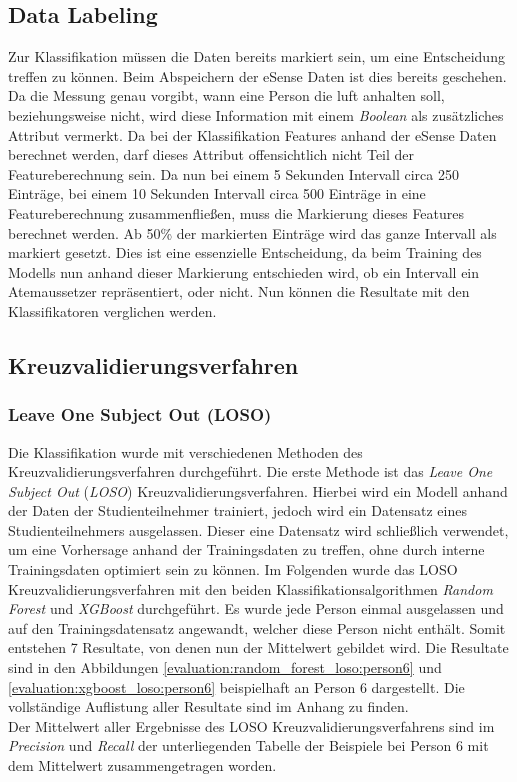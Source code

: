 \subsection{Data Labeling}
Zur Klassifikation müssen die Daten bereits markiert sein, um eine Entscheidung treffen zu können. 
Beim Abspeichern der eSense Daten ist dies bereits geschehen. 
Da die Messung genau vorgibt, wann eine Person die luft anhalten soll, beziehungsweise nicht, wird diese Information mit einem \textit{Boolean} als zusätzliches Attribut vermerkt.
Da bei der Klassifikation Features anhand der eSense Daten berechnet werden, darf dieses Attribut offensichtlich nicht Teil der Featureberechnung sein.
Da nun bei einem 5 Sekunden Intervall circa 250 Einträge, bei einem 10 Sekunden Intervall circa 500 Einträge in eine Featureberechnung zusammenfließen, muss die Markierung dieses Features berechnet werden.
Ab 50\% der markierten Einträge wird das ganze Intervall als markiert gesetzt.
Dies ist eine essenzielle Entscheidung, da beim Training des Modells nun anhand dieser Markierung entschieden wird, ob ein Intervall ein Atemaussetzer repräsentiert, oder nicht.
Nun können die Resultate mit den Klassifikatoren verglichen werden.

\subsection{Kreuzvalidierungsverfahren}
\subsubsection{Leave One Subject Out (LOSO)}
Die Klassifikation wurde mit verschiedenen Methoden des Kreuzvalidierungsverfahren durchgeführt. 
Die erste Methode ist das \textit{Leave One Subject Out} (\textit{LOSO}) Kreuzvalidierungsverfahren. 
Hierbei wird ein Modell anhand der Daten der Studienteilnehmer trainiert, jedoch wird ein Datensatz eines Studienteilnehmers ausgelassen. 
Dieser eine Datensatz wird schließlich verwendet, um eine Vorhersage anhand der Trainingsdaten zu treffen, ohne durch interne Trainingsdaten optimiert sein zu können.
Im Folgenden wurde das LOSO Kreuzvalidierungsverfahren mit den beiden Klassifikationsalgorithmen \textit{Random Forest} und \textit{XGBoost} durchgeführt. 
Es wurde jede Person einmal ausgelassen und auf den Trainingsdatensatz angewandt, welcher diese Person nicht enthält. 
Somit entstehen 7 Resultate, von denen nun der Mittelwert gebildet wird.
Die Resultate sind in den Abbildungen \ref{evaluation:random_forest_loso:person6} und \ref{evaluation:xgboost_loso:person6} beispielhaft an Person 6 dargestellt.
Die vollständige Auflistung aller Resultate sind im Anhang zu finden. \\
Der Mittelwert aller Ergebnisse des LOSO Kreuzvalidierungsverfahrens sind im \textit{Precision} und \textit{Recall} der unterliegenden Tabelle der Beispiele bei Person 6 mit dem Mittelwert zusammengetragen worden. 

